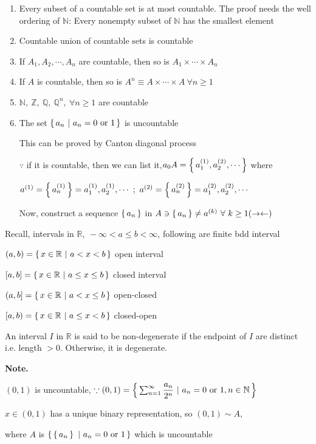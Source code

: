 \begin{enumerate}
	\item Every subset of a countable set is at most countable. The proof needs the well ordering of $\mathbb N$: Every nonempty subset of $\mathbb N$ has the smallest element
	\item Countable union of countable sets is countable
	\item If $A_1,A_2,\cdots,A_n$ are countable, then so is $A_1 \times \cdots \times A_n$
	\item If $A$ is countable, then so is $A^n \equiv A \times \cdots \times A~ \forall	n \geq 1$
	\item $\mathbb N,~\mathbb Z,~\mathbb Q,~\mathbb Q^n,~\forall n \geq 1$ are countable
	\item The set $\left\{ \,a_n~|~a_n=0\text{ or }1 \,\right\}$ is uncountable
	
	This can be proved by Canton diagonal process
	
	$\because$ if it is countable, then we can list it,$a_0 A = \left\{ \,a^{(1)}_1,a^{(2)}_2,\cdots \,\right\}$ where
	
	$a^{(1)} = \left\{ \,a_n^{(1)} \,\right\} = a^{(1)}_{1},a^{(1)}_2,\cdots~;~a^{(2)} = \left\{ \,a_n^{(2)} \,\right\} = a^{(2)}_{1},a^{(2)}_2,\cdots$
	
	Now, construct a sequence $\left\{ \,a_n \,\right\}$ in $A \ni \left\{ \,a_n \,\right\} \neq a^{(k)} ~\forall~k\geq 1 (\rightarrow\leftarrow)$
\end{enumerate} 

\newpage

Recall, intervals in $\mathbb R,~-\infty < a \leq b < \infty$, following are finite bdd interval

\begin{tcolorbox}
	$(a,b) = \left\{ \,x \in \mathbb R~|~a<x<b \,\right\}$  open interval
	
	$\left[a,b\right] = \left\{ \,x \in \mathbb R~|~a\leq x \leq b \,\right\}$ closed interval
	
	$\left(a,b\right] = \left\{ \,x\in \mathbb R~|~a < x \leq b \,\right\}$ open-closed
	
	$\left[a,b \right) = \left\{ \,x \in \mathbb R~|~a\leq x < b \,\right\}$ closed-open
\end{tcolorbox}

An interval $I$ in $\mathbb R$ is said to be non-degenerate if the endpoint of $I$ are distinct i.e. length $> 0$. Otherwise, it is degenerate.

\textbf{Note.}

\begin{tcolorbox}
	$(0,1)$ is uncountable, $\because (0,1) = \left\{ \,\sum^{\infty}_{n=1} \dfrac{a_n}{2^n}~|~a_n = 0 \text{ or } 1,n\in \mathbb N \,\right\}$
	
	$x \in (0,1)$ has a unique binary representation, so $(0,1) \sim A$, 
	
	where $A$ is $\left\{ \,\left\{ \,a_n \,\right\}~|~a_n = 0 \text{ or } 1 \,\right\}$ which is uncountable
\end{tcolorbox}

